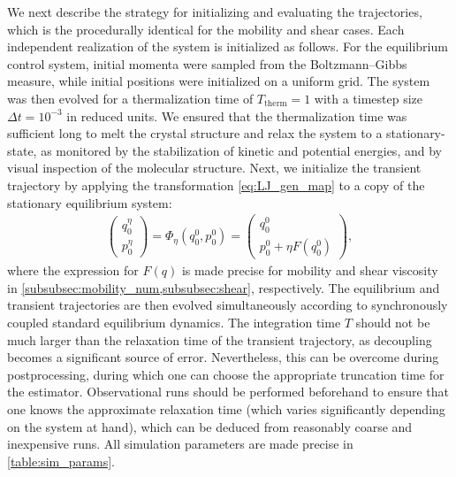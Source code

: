 We next describe the strategy for initializing and evaluating the trajectories, which is the procedurally identical for the mobility and shear cases. Each independent realization of the system is initialized as follows. For the equilibrium control system, initial momenta were sampled from the Boltzmann--Gibbs measure, while initial positions were initialized on a uniform grid. The system was then evolved for a thermalization time of $T_\mathrm{therm} = 1$ with a timestep size $\Delta t=10^{-3}$ in reduced units. We ensured that the thermalization time was sufficient long to melt the crystal structure and relax the system to a stationary-state, as monitored by the stabilization of kinetic and potential energies, and by visual inspection of the molecular structure. Next, we initialize the transient trajectory by applying the transformation \eqref{eq:LJ_gen_map} to a copy of the stationary equilibrium system:
%
\begin{align}
    \begin{pmatrix}
        q_0^\eta \\ p_0^\eta
    \end{pmatrix}
	 = \Phi_\eta(q_0^0,p_0^0) = 
	\begin{pmatrix}
 	  q_0^0 \\ p_0^0 + \eta F(q_0^0)
 	\end{pmatrix},
 	\label{eq:LJ_gen_map}
\end{align}
%
where the expression for $F(q)$ is made precise for mobility and shear viscosity in \cref{subsubsec:mobility_num,subsubsec:shear}, respectively. The equilibrium and transient trajectories are then evolved simultaneously according to synchronously coupled standard equilibrium dynamics. The integration time $T$ should not be much larger than the relaxation time of the transient trajectory, as decoupling becomes a significant source of error. Nevertheless, this can be overcome during postprocessing, during which one can choose the appropriate truncation time for the estimator. Observational runs should be performed beforehand to ensure that one knows the approximate relaxation time (which varies significantly depending on the system at hand), which can be deduced from reasonably coarse and inexpensive runs. All simulation parameters are made precise in \cref{table:sim_params}.
%
